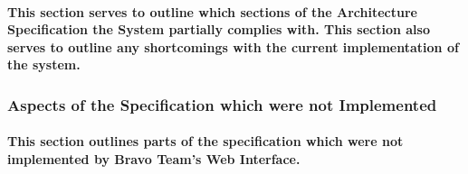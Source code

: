 \documentclass[english]{article}
\begin{document}
\paragraph{This section serves to outline which sections of the Architecture Specification the System partially complies with. This section also serves to outline any shortcomings with the current implementation of the system.}

\subsubsection{Aspects of the Specification which were not Implemented}
\paragraph{This section outlines parts of the specification which were not implemented by Bravo Team's Web Interface.}
\end{document}
